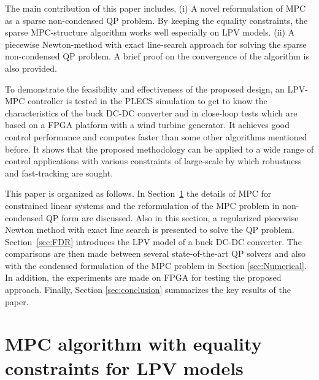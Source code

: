 \documentclass[journal]{IEEEtran}
\begin{document}
The main contribution of this paper includes, (i) A novel reformulation of MPC as a sparse non-condensed QP problem. By keeping the equality constraints, the sparse MPC-structure algorithm works well especially on LPV models. (ii) A piecewise Newton-method with exact line-search approach for solving the sparse non-condensed QP problem. A brief proof on the convergence of the algorithm is also provided.

To demonstrate the feasibility and effectiveness of the proposed design, an LPV-MPC controller is tested in the  PLECS\cite{alimeling1999plecs} simulation to get to know the characteristics of the buck DC-DC converter and in close-loop tests which are based on a FPGA platform with a wind turbine generator. It achieves good control performance and computes faster than some other algorithms mentioned before. It shows that the proposed methodology can be applied to a wide range of control applications with various constraints of large-scale by which robustness and fast-tracking are sought.

This paper is organized as follows. In Section~\ref{sec:CPM} the details of MPC for constrained linear systems and the reformulation of the MPC problem in non-condensed QP form are discussed. Also in this section, a regularized piecewise Newton method with exact line search is presented to solve the QP problem. Section~\ref{sec:FDR} introduces the LPV model of a buck DC-DC converter. The comparisons  are then made between several state-of-the-art QP solvers and also with the condensed formulation of the MPC problem in Section \ref{sec:Numerical}. In addition, the experiments are made on FPGA for testing the proposed approach. Finally, Section \ref{sec:conclusion} summarizes the key results of the paper.

\section{MPC algorithm with equality constraints for LPV models}\label{sec:CPM}
\end{document}
